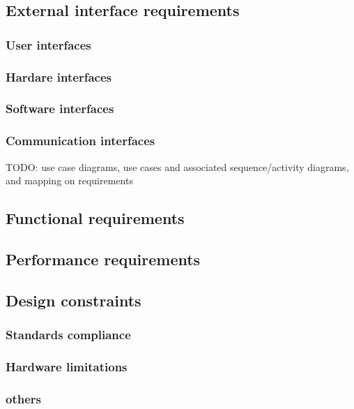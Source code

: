 \subsection{External interface requirements}

\subsubsection{User interfaces}

\subsubsection{Hardare interfaces}

\subsubsection{Software interfaces}

\subsubsection{Communication interfaces}
TODO: use case diagrams, use cases and associated sequence/activity diagrams, and mapping on requirements

\subsection{Functional requirements}

\subsection{Performance requirements}

\subsection{Design constraints}

\subsubsection{Standards compliance}

\subsubsection{Hardware limitations}

\subsubsection{others}

